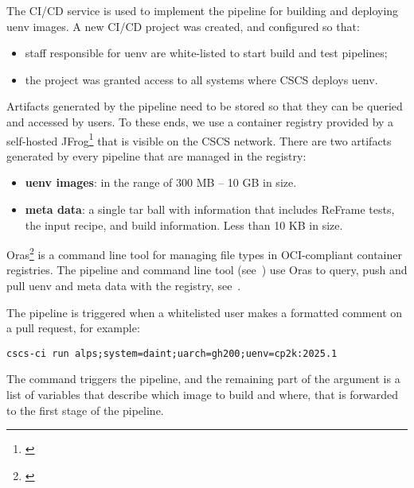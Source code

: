 The CI/CD service is used to implement the pipeline for building and deploying uenv images.
A new CI/CD project was created, and configured so that:
\begin{itemize}
    \item staff responsible for uenv are white-listed to start build and test pipelines;
    \item the project was granted access to all systems where CSCS deploys uenv.
\end{itemize}


Artifacts generated by the pipeline need to be stored so that they can be queried and accessed by users.
To these ends, we use a container registry provided by a self-hosted JFrog\footnote{\href{https://jfrog.com}{}} that is visible on the CSCS network.
There are two artifacts generated by every pipeline that are managed in the registry:
\begin{itemize}
    \item \textbf{uenv \squashfs images}: in the range of 300 MB -- 10 GB in size.
    \item \textbf{meta data}: a single tar ball with information that includes ReFrame tests, the input recipe, and build information. Less than 10 KB in size.
\end{itemize}

Oras\footnote{\href{https://oras.land}{}} is a command line tool for managing file types in OCI-compliant container registries.
The pipeline and command line tool (see~) use Oras to query, push and pull uenv and meta data with the registry, see~.


The pipeline is triggered when a whitelisted user makes a formatted comment on a pull request, for example:
\begin{lstlisting}
cscs-ci run alps;system=daint;uarch=gh200;uenv=cp2k:2025.1
\end{lstlisting}
The  command triggers the pipeline, and the remaining part of the argument is a list of variables that describe which image to build and where, that is forwarded to the first stage of the pipeline.

